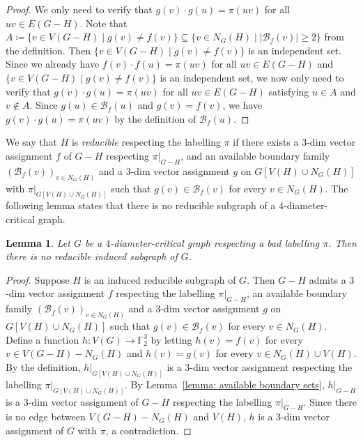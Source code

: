 \documentclass[
final
]{dmtcs-episciences}
\newtheorem{lemma}[theorem]{Lemma}
\begin{document}
\begin{proof}
    We only need to verify that $g(v)\cdot g(u) = \pi(uv)$ for all $uv \in E(G-H)$.
    Note that $A \coloneqq \{ v \in V(G-H) \mid g(v) \neq f(v) \} \subseteq \{ v \in N_G(H) \mid |\mathcal{B}_f(v)| \ge 2 \}$ from the definition.
    Then $\{ v \in V(G-H) \mid g(v) \neq f(v) \}$ is an independent set.
    Since we already have $f(v)\cdot f(u) = \pi(uv)$ for all $uv \in E(G-H)$ and $\{ v \in V(G-H) \mid g(v) \neq f(v) \}$ is an independent set, we now only need to verify that $g(v)\cdot g(u) = \pi(uv)$ for all $uv \in E(G-H)$ satisfying $u \in A$ and $v \notin A$.
    Since $g(u) \in \mathcal{B}_f(u)$ and $g(v) = f(v)$, we have $g(v)\cdot g(u) = \pi(uv)$ by the definition of $\mathcal{B}_f(u)$.
\end{proof}

We say that $H$ is \emph{reducible} respecting the labelling $\pi$ if there exists a $3$-dim vector assignment $f$ of $G-H$ respecting $\pi|_{G-H}$, and an available boundary family ${(\mathcal{B}_f(v))}_{v \in N_G(H)}$ and a $3$-dim vector assignment $g$ on $G[V(H) \cup N_G(H)]$ with  $\pi|_{G[V(H) \cup N_G(H)]}$ such that $g(v) \in \mathcal{B}_f(v)$ for every $v \in N_G(H)$. The following lemma states that there is no reducible subgraph of a $4$-diameter-critical graph.

\begin{lemma}\label{lemma: reducible}
Let $G$ be a $4$-diameter-critical graph respecting a bad labelling $\pi$.
Then there is no reducible induced subgraph of $G$.
\end{lemma}

\begin{proof}
    Suppose  $H$ is an induced reducible subgraph of $G$.
    Then $G-H$ admits a $3$-dim vector assignment $f$ respecting the labelling $\pi|_{G-H}$, an available boundary family ${(\mathcal{B}_f(v))}_{v \in N_G(H)}$ and a $3$-dim vector assignment $g$ on $G[V(H) \cup N_G(H)]$ such that $g(v) \in \mathcal{B}_f(v)$ for every $v \in N_G(H)$.
    Define a function $h: V(G) \rightarrow \mathbb{F}_2^3$ by letting $h(v) = f(v)$ for every $v \in V(G-H) - N_G(H)$ and $h(v) = g(v)$ for every $v \in N_G(H)\cup V(H)$.
    By the definition, $h|_{G[V(H) \cup N_G(H)]}$ is a $3$-dim vector assignment respecting the labelling $\pi|_{G[V(H) \cup N_G(H)]}$.
    By Lemma~\ref{lemma: available boundary sets}, $h|_{G-H}$ is a $3$-dim vector assignment of $G-H$ respecting the labelling $\pi|_{G-H}$. Since there is no edge between $V(G-H) - N_G(H)$ and $V(H)$, $h$ is a $3$-dim vector assignment of $G$ with $\pi$, a contradiction.
\end{proof}
\end{document}
